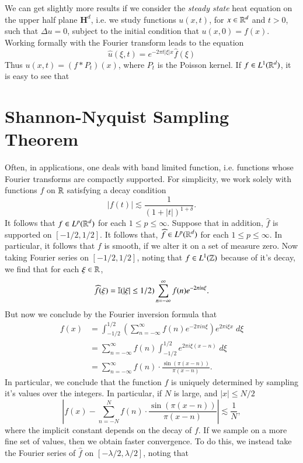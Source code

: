 We can get slightly more results if we consider the \emph{steady state} heat equation on the upper half plane $\mathbf{H}^d$, i.e. we study functions $u(x,t)$, for $x \in \operatorname{\mathbb{R}}^d$ and $t > 0$, such that $\Delta u = 0$, subject to the initial condition that $u(x,0) = f(x)$. Working formally with the Fourier transform leads to the equation
%
\[ \widehat{u}(\xi,t) = e^{-2 \pi t |\xi| x} \widehat{f}(\xi) \]
%
Thus $u(x,t) = (f * P_t)(x)$, where $P_t$ is the Poisson kernel. If $f \in L^1(\operatorname{\mathbb{R}}^d)$, it is easy to see that 


\section{Shannon-Nyquist Sampling Theorem}

Often, in applications, one deals with band limited function, i.e. functions whose Fourier transforms are compactly supported. For simplicity, we work solely with functions $f$ on $\operatorname{\mathbb{R}}$ satisfying a decay condition
%
\[ |f(t)| \lesssim \frac{1}{(1 + |t|)^{1 + \delta}}. \]
%
It follows that $f \in L^p(\operatorname{\mathbb{R}}^d)$ for each $1 \leq p \leq \infty$. Suppose that in addition, $\widehat{f}$ is supported on $[-1/2,1/2]$. It follows that, $\widehat{f} \in L^p(\operatorname{\mathbb{R}}^d)$ for each $1 \leq p \leq \infty$. In particular, it follows that $f$ is smooth, if we alter it on a set of measure zero. Now taking Fourier series on $[-1/2,1/2]$, noting that $f \in L^1(\operatorname{\mathbb{Z}})$ because of it's decay, we find that for each $\xi \in \operatorname{\mathbb{R}}$,
%
\[ \widehat{f}(\xi) = \operatorname{\mathbb{I}}(|\xi| \leq 1/2) \sum_{n = -\infty}^\infty f(n) e^{-2 \pi i n \xi}. \]
%
But now we conclude by the Fourier inversion formula that
%
\begin{align*}
    f(x) &= \int_{-1/2}^{1/2} \left( \sum_{n = -\infty}^\infty f(n) e^{-2 \pi i n \xi} \right) e^{2 \pi i \xi x}\; d\xi\\
    &= \sum_{n = -\infty}^\infty f(n) \int_{-1/2}^{1/2} e^{2 \pi i \xi (x-n)}\; d\xi\\
    &= \sum_{n = -\infty}^\infty f(n) \cdot \frac{\sin(\pi (x - n))}{\pi (x-n)}.
\end{align*}
%
In particular, we conclude that the function $f$ is uniquely determined by sampling it's values over the integers. In particular, if $N$ is large, and $|x| \leq N/2$
%
\[ \left| f(x) - \sum_{n = -N}^N f(n) \cdot \frac{\sin(\pi(x - n))}{\pi (x - n)} \right| \lesssim \frac{1}{N}, \]
%
where the implicit constant depends on the decay of $f$. If we sample on a more fine set of values, then we obtain faster convergence. To do this, we instead take the Fourier series of $\widehat{f}$ on $[-\lambda/2,\lambda/2]$, noting that
